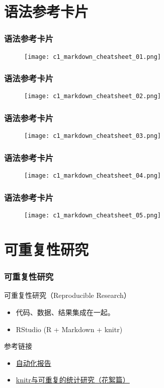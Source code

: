 \section{语法参考卡片}
\begin{frame}
  \frametitle{语法参考卡片}
  \begin{figure}
    \centering
    \texttt{[image: c1\_markdown\_cheatsheet\_01.png]}
  \end{figure}
\end{frame}

\begin{frame}
  \frametitle{语法参考卡片}
  \begin{figure}
    \centering
    \texttt{[image: c1\_markdown\_cheatsheet\_02.png]}
  \end{figure}
\end{frame}

\begin{frame}
  \frametitle{语法参考卡片}
  \begin{figure}
    \centering
    \texttt{[image: c1\_markdown\_cheatsheet\_03.png]}
  \end{figure}
\end{frame}

\begin{frame}
  \frametitle{语法参考卡片}
  \begin{figure}
    \centering
    \texttt{[image: c1\_markdown\_cheatsheet\_04.png]}
  \end{figure}
\end{frame}

\begin{frame}
  \frametitle{语法参考卡片}
  \begin{figure}
    \centering
    \texttt{[image: c1\_markdown\_cheatsheet\_05.png]}
  \end{figure}
\end{frame}

\section{可重复性研究}
\begin{frame}
  \frametitle{可重复性研究}
  \begin{block}{可重复性研究（Reproducible Research）}
    \begin{itemize}
      \item 代码、数据、结果集成在一起。
      \item RStudio (R + Markdown + knitr)
    \end{itemize}
  \end{block}
  \pause
  \begin{block}{参考链接}
    \begin{itemize}
      \item \href{https://github.com/yihui/r-ninja/blob/master/11-auto-report.md}{自动化报告}
      \item \href{http://cos.name/2012/06/reproducible-research-with-knitr/}{knitr与可重复的统计研究（花絮篇）}
    \end{itemize}
  \end{block}
\end{frame}

